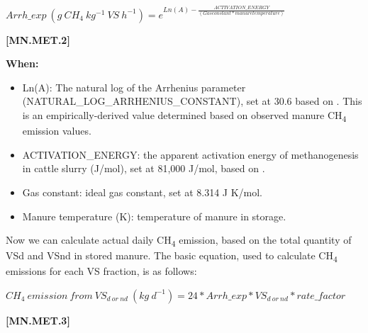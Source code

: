 \begin{refsection}
    \begin{center}
\(Arrh\_exp\ (g\ CH_{4}\ kg^{-1}\ VS\ h^{-1}) = e ^{Ln(A) - \frac{ACTIVATION\_ENERGY}{(Gas constant * manure temperature)}}\)
    \end{center}
        \vspace{0.5cm} 
    
            {\raggedleft \textbf{[MN.MET.2]}\par}
            \vspace{0.5cm}

    \textbf{When:}
    \begin{itemize}
        \item Ln(A): The natural log of the Arrhenius parameter (NATURAL\_LOG\_ARRHENIUS\_CONSTANT), set at 30.6 based on \cite{Petersen2024}. This is an empirically-derived value determined based on observed manure CH\textsubscript{4} emission values.
        \item ACTIVATION\_ENERGY: the apparent activation energy of methanogenesis in cattle slurry (J/mol), set at 81,000 J/mol, based on \cite{Elsgaard2016}. 
        \item Gas constant: ideal gas constant, set at 8.314 J K/mol.
        \item Manure temperature (K): temperature of manure in storage. 


    \end{itemize}
    \vspace{0.3cm}

    Now we can calculate actual daily CH\textsubscript{4} emission, based on the total quantity of VSd and VSnd in stored manure. The basic equation, used to calculate CH\textsubscript{4} emissions for each VS fraction, is as follows:
        \vspace{0.5cm}

    \begin{center}
\(CH_{4}\ emission\ from\ VS_{d\ or\ nd}\ (kg\ d^{-1}) = 24 * Arrh\_exp * VS_{d\ or\ nd} * rate\_factor\)
    \end{center}
        \vspace{0.5cm} 
    
            {\raggedleft \textbf{[MN.MET.3]}\par}
            \vspace{0.5cm}
            

\end{refsection}
